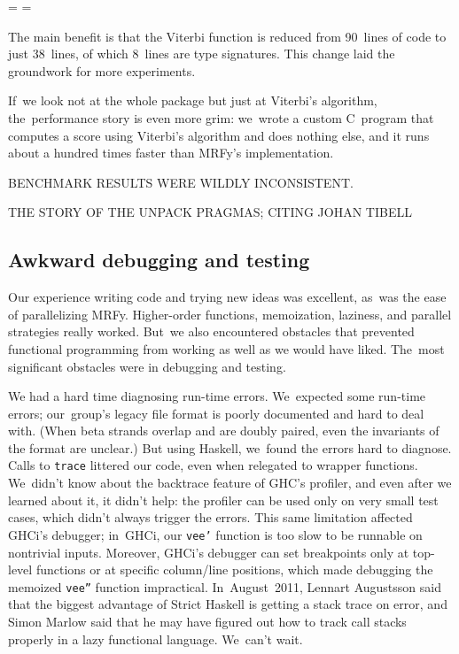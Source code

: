 \documentclass[]{jfp1}
\newcommand\mrfy{MRFy} %
\newcommand\seclabel[1]{\label{sec:#1}}
\newif\ifverbatimsmall
\newcommand\smallverbatiminput[1]{%
  \verbatimsmalltrue
  \presvtopsep=\topsep
  \topsep=0.78\topsep
  \verbatimsmallfalse
  \topsep=\presvtopsep
}
\begin{document}
\smallverbatiminput{hov-prevs}


The main benefit is that the Viterbi function is reduced from 90~lines
of code to just 38~lines, of which 8~lines are type signatures.
This change laid the groundwork for more experiments.




If~we look not at the whole package but just at Viterbi's algorithm,
the~performance story is even more grim:
we~wrote a custom C~program that computes a score using Viterbi's
algorithm and does nothing else, and it runs about a hundred times
faster than \mrfy's implementation.







BENCHMARK RESULTS WERE WILDLY INCONSISTENT.




THE STORY OF THE UNPACK PRAGMAS; CITING JOHAN TIBELL

\subsection{Awkward debugging and testing}

\seclabel{awkward-profiling}

Our experience writing code and trying new ideas was excellent, as~was
the ease of parallelizing \mrfy.
Higher-order functions, memoization, laziness, and parallel strategies
really worked.
But~we also encountered obstacles that prevented functional
programming from working as well as we would have liked.
The~most significant obstacles were in debugging and testing.

We had a hard time diagnosing run-time errors.
We~expected some run-time errors;
our~group's legacy file
format is poorly documented and hard to deal with.
(When beta
strands overlap and are doubly paired, even the invariants of the
format are unclear.)
But using Haskell, we~found the errors hard to diagnose.
Calls to
\texttt{trace} 
littered our code,
even when relegated to wrapper functions.
We~didn't know about the backtrace feature of GHC's profiler,
and even after we learned about it, it didn't help:
the profiler can be used only on very small test cases,
which didn't always trigger the errors.
This same limitation affected GHCi's debugger; 
in~GHCi, our \texttt{vee'} function
is too slow to be runnable on nontrivial
inputs.
Moreover,  GHCi's debugger can set breakpoints only at top-level functions
or at specific column/line positions, which made debugging the memoized
\texttt{vee''} function impractical.
In~August~2011, 
Lennart Augustsson said that the biggest advantage of Strict
Haskell is getting a stack trace on error,
and Simon Marlow said that he may have figured out how to track call
stacks properly in a lazy functional language.
We~can't wait.
\end{document}
